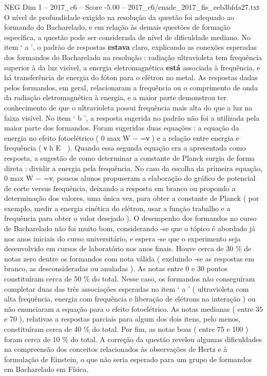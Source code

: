 \begin{textsample}{NEG Dim 1 – 2017\_c6 – Score -5.00 – 2017\_c6/enade\_2017\_fis\_eeb3bfda27.txt}
O nível de profundidade exigido na resolução da questão foi adequado ao formando do Bacharelado, e em relação às demais questões de formação específica, a questão pode ser considerada de nível de dificuldade mediano.
No item ‘ a ’, o padrão de respostas \textbf{estava} claro, explicando as conexões esperadas dos formandos do Bacharelado na resolução : radiação ultravioleta tem frequência superior à da luz visível, a energia eletromagnética \textbf{está} associada à frequência, e há transferência de energia do fóton para o elétron no metal.
As respostas dadas pelos formandos, em geral, relacionaram a frequência ou o comprimento de onda da radiação eletromagnética à energia, e a maior parte demonstrou ter conhecimento de que o ultravioleta possui frequência mais alta do que a luz na faixa visível.
No item ‘ b ’, a resposta sugerida no padrão não foi a utilizada pela maior parte dos formandos.
Foram sugeridas duas equações : a equação da energia no efeito fotoelétrico ( 0 max W − =ν ) e a relação entre energia e frequência ( ν h E  ).
Quando essa segunda equação era a apresentada como resposta, a sugestão de como determinar a constante de Planck surgia de forma direta : dividir a energia pela frequência.
No caso da escolha da primeira equação, 0 max W − =ν, poucos alunos propuseram a elaboração do gráfico de potencial de corte versus frequência, deixando a resposta em branco ou propondo a determinação dos valores, uma única vez, para obter a constante de Planck ( por exemplo, medir a energia cinética do elétron, usar a função trabalho e a frequência para obter o valor desejado ).
O desempenho dos formandos no curso de Bacharelado não foi muito bom, considerando -se que o tópico é abordado já nos anos iniciais do curso universitário, e espera -se que o experimento seja desenvolvido em cursos de laboratório nos anos finais.
Houve cerca de 30 \% de notas zero dentre os formandos com nota válida ( excluindo -se as respostas em branco, as desconsideradas ou anuladas ).
As notas entre 0 e 30 pontos constituíram cerca de 50 \% do total.
Nesse caso, os formandos não conseguiram completar duas das três associações esperadas no item ‘ a ’ ( ultravioleta com alta frequência, energia com frequência e liberação de elétrons na interação ) ou não enunciaram a equação para o efeito fotoelétrico.
As notas medianas ( entre 35 e 70 ), relativas a respostas parciais para algum dos dois itens, pelo menos, constituíram cerca de 40 \% do total.
Por fim, as notas boas ( entre 75 e 100 ) foram cerca de 10 \% do total.
A correção da questão revelou algumas dificuldades na compreensão dos conceitos relacionados às observações de Hertz e à formulação de Einstein, o que não seria esperado para um grupo de formandos em Bacharelado em Física.

\end{textsample}
